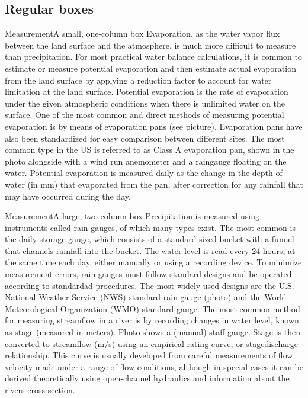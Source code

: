 \lipsum[13-14]

\subsection{Regular boxes}

\begin{boxmain}[S][t][label=C01-box-pan]{Measurement}{A small, one-column box}
Evaporation, as the water vapor flux between the land surface and the atmosphere, is much more difficult to measure than precipitation. For most practical water balance calculations, it is common to estimate or measure potential evaporation and then estimate actual evaporation from the land surface by applying a reduction factor to account for water limitation at the land surface. Potential evaporation is the rate of evaporation under the given atmospheric conditions when there is unlimited water on the surface. One of the most common and direct methods of measuring potential evaporation is by means of evaporation pans (see picture). Evaporation pans have also been standardized for easy comparison between different sites. The most common type in the US is referred to as Class A evaporation pan, shown in the photo alongside with a wind run anemometer and a raingauge floating on the water. Potential evaporation is measured daily as the change in the depth of water (in mm) that evaporated from the pan, after correction for any rainfall that may have occurred during the day.
\end{boxmain}

\lipsum[16-17]

\begin{boxmain}[L][t][label=C01-box-gauges]{Measurement}{A large, two-column box}
Precipitation is measured using instruments called rain gauges, of which many types exist. The most common is the daily storage gauge, which consists of a standard-sized bucket with a funnel that channels rainfall into the bucket. The water level is read every 24 hours, at the same time each day, either manually or using a recording device. To minimize measurement errors, rain gauges must follow standard designs and be operated according to standardad procedures. The most widely used designs are the U.S. National Weather Service (NWS) standard rain gauge (photo) and the World Meteorological Organization (WMO) standard gauge. The most common method for measuring streamflow in a river is by recording changes in water level, known as stage (measured in meters). Photo shows a (manual) staff gauge. Stage is then converted to streamflow (m/s) using an empirical rating curve, or stagedischarge relationship. This curve is usually developed from careful measurements of flow velocity made under a range of flow conditions, although in special cases it can be derived theoretically using open-channel hydraulics and information about the rivers cross-section.
\end{boxmain}

